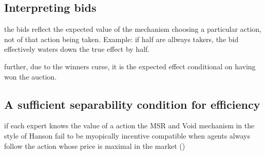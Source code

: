 \subsection{Interpreting bids}

the bids reflect the expected value of the mechanism choosing a particular action, not of that action being taken.  Example: if half are allways takers, the bid effectively waters down the true effect by half.

further, due to the winners curse, it is the expected effect conditional on having won the auction. 


\subsection{A sufficient separability condition for efficiency}

if each expert knows the value of a action the MSR and Void mechanism in the style of Hanson fail to be myopically incentive compatible when agents always follow the action whose price is maximal in the market (\cite{othman2010decision})


